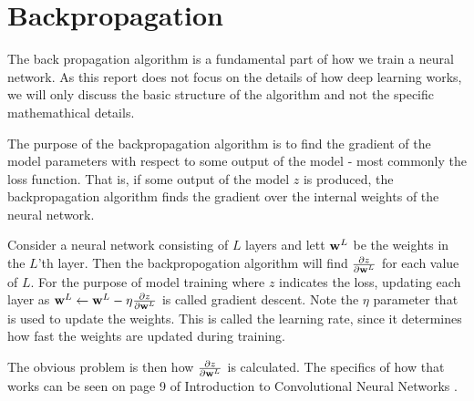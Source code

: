 \section{Backpropagation}
The back propagation algorithm is a fundamental part of how we train a neural network.
As this report does not focus on the details of how deep learning works, we will only discuss the
basic structure of the algorithm and not the specific mathemathical details.

The purpose of the backpropagation algorithm is to find the gradient of the model parameters with respect
to some output of the model - most commonly the loss function.
That is, if some output of the model $z$ is produced, the backpropagation algorithm finds the gradient over
the internal weights of the neural network.

Consider a neural network consisting of $L$ layers and lett $\textbf{w}^L$ be the weights in the $L$'th layer.
Then the backpropogation algorithm will find
$\frac{\partial z}{\partial \textbf{w}^L}$ for each value of $L$.
For the purpose of model training where $z$ indicates the loss, updating each layer as
$\textbf{w}^L \leftarrow \textbf{w}^L - \eta \frac{\partial z}{\partial \textbf{w}^L}$
is called gradient descent.
Note the $\eta$ parameter that is used to update the weights.
This is called the learning rate, since it determines how fast the weights are updated during training.

The obvious problem is then how $\frac{\partial z}{\partial \textbf{w}^L}$ is calculated.
The specifics of how that works can be seen on page 9 of Introduction to Convolutional Neural Networks \cite{tensorIntroduction}.
